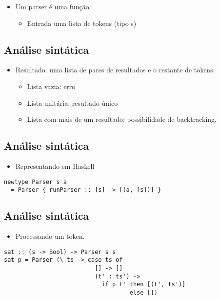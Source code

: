 \documentclass[11pt]{article}
\begin{document}
\begin{itemize}
\item Um parser é uma função:
\begin{itemize}
\item Entrada uma lista de tokens (tipo s)
\end{itemize}
\end{itemize}
\subsection*{Análise sintática}
\label{sec:org005f3f3}
\begin{itemize}
\item Resultado: uma lista de pares de resultados e o restante de tokens. 
\begin{itemize}
\item Lista vazia: erro
\item Lista unitária: resultado único
\item Lista com mais de um resultado: possibilidade de backtracking.
\end{itemize}
\end{itemize}
\subsection*{Análise sintática}
\label{sec:orgbad0d19}

\begin{itemize}
\item Representando em Haskell
\end{itemize}

\begin{verbatim}
newtype Parser s a 
  = Parser { runParser :: [s] -> [(a, [s])] }
\end{verbatim}
\subsection*{Análise sintática}
\label{sec:org77bbf64}

\begin{itemize}
\item Processando um token.
\end{itemize}

\begin{verbatim}
sat :: (s -> Bool) -> Parser s s
sat p = Parser (\ ts -> case ts of 
                          [] -> [] 
                          (t' : ts') -> 
                            if p t' then [(t', ts')] 
                                    else [])
\end{verbatim}
\end{document}
